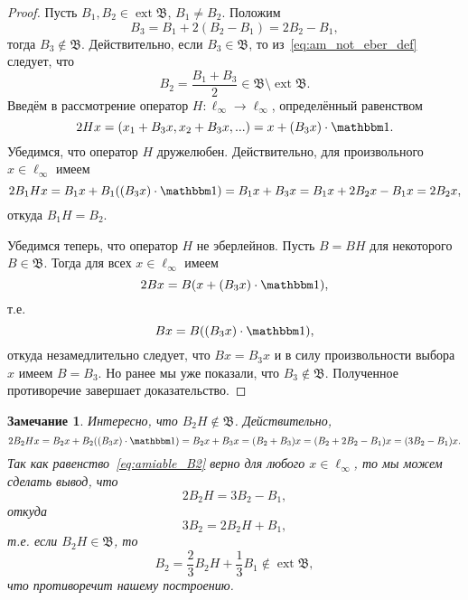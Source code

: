 \documentclass[a4paper,14pt]{article} %
\DeclareMathOperator{\ext}{ext}
\newcommand{\B}{\ensuremath{\mathfrak{B}}}
\newcommand{\one}{\ensuremath{\mathbbm 1}}
\theoremstyle{plain}
\newtheorem{remark}[lemma]{Замечание}
\begin{document}
	\begin{proof}
		Пусть $B_1, B_2 \in \ext \B$, $B_1 \ne B_2$.
		Положим
		\begin{equation}
			\label{eq:am_not_eber_def}
			B_3 = B_1 + 2(B_2-B_1) = 2B_2-B_1,
		\end{equation}
		тогда $B_3 \notin \B$.
		Действительно, если $B_3 \in \B$, то из~\eqref{eq:am_not_eber_def} следует, что
		\begin{equation}
			B_2 = \frac{B_1 + B_3}2 \in \B \setminus \ext \B
			.
		\end{equation}
		Введём в рассмотрение оператор $H:\ell_\infty\to\ell_\infty$, определённый равенством
		\begin{equation}
			2Hx = (x_1 + B_3x, x_2 + B_3x, ...) = x + (B_3 x) \cdot \one
			.
		\end{equation}
		Убедимся, что оператор $H$ дружелюбен.
		Действительно, для произвольного $x\in\ell_\infty$ имеем
		\begin{equation}
			2 B_1 H x = B_1 x + B_1 ((B_3 x) \cdot\one) = B_1 x + B_3 x =
			B_1 x + 2 B_2 x - B_1 x = 2B_2 x
			,
		\end{equation}
		откуда $B_1 H = B_2$.

		Убедимся теперь, что оператор $H$ не эберлейнов.
		Пусть $B = BH$ для некоторого $B\in\B$.
		Тогда для всех $x\in\ell_\infty$ имеем
		\begin{equation}
			2Bx = B (x + (B_3 x) \cdot \one)
			,
		\end{equation}
		т.е.
		\begin{equation}
			Bx =  B((B_3 x) \cdot \one)
			,
		\end{equation}
		откуда незамедлительно следует, что $Bx = B_3x$ и в силу произвольности выбора $x$ имеем $B=B_3$.
		Но ранее мы уже показали, что $B_3\notin \B$.
		Полученное противоречие завершает доказательство.
	\end{proof}

	\begin{remark}
		Интересно, что $B_2H\notin \B$.
		Действительно,
		\begin{equation}
			\label{eq:amiable_B2}
			2B_2 H x = B_2 x + B_2((B_3 x)\cdot \one) = B_2 x + B_3 x  =
			(B_2 + B_3) x  = (B_2+2B_2-B_1)x = (3B_2-B_1)x
			.
		\end{equation}
		Так как равенство~\eqref{eq:amiable_B2} верно для любого $x\in\ell_\infty$,
		то мы можем сделать вывод, что
		\begin{equation}
			2B_2H = 3B_2-B_1
			,
		\end{equation}
		откуда
		\begin{equation}
			3B_2 = 2B_2H  + B_1
			,
		\end{equation}
		т.е. если $B_2H\in\B$, то
		\begin{equation}
			B_2 = \frac23 B_2H  + \frac13 B_1 \notin \ext\B
			,
		\end{equation}
		что противоречит нашему построению.
	\end{remark}
\end{document}
